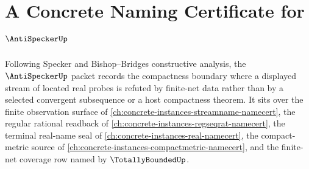 \chapter{A Concrete Naming Certificate for $\AntiSpeckerUp$}
\label{ch:concrete-instances-anti-specker-namecert}

Following Specker and Bishop--Bridges constructive analysis, the $\AntiSpeckerUp$ packet records the compactness boundary where a displayed stream of located real probes is refuted by finite-net data rather than by a selected convergent subsequence or a host compactness theorem. It sits over the finite observation surface of \autoref{ch:concrete-instances-streamname-namecert}, the regular rational readback of \autoref{ch:concrete-instances-regseqrat-namecert}, the terminal real-name seal of \autoref{ch:concrete-instances-real-namecert}, the compact-metric source of \autoref{ch:concrete-instances-compactmetric-namecert}, and the finite-net coverage row named by $\TotallyBoundedUp$.

